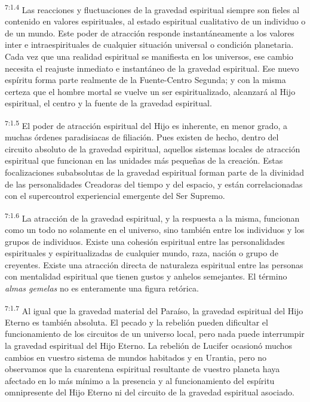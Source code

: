 \par
\textsuperscript{7:1.4} Las reacciones y fluctuaciones de la gravedad espiritual siempre son fieles al contenido en valores espirituales, al estado espiritual cualitativo de un individuo o de un mundo. Este poder de atracción responde instantáneamente a los valores inter e intraespirituales de cualquier situación universal o condición planetaria. Cada vez que una realidad espiritual se manifiesta en los universos, ese cambio necesita el reajuste inmediato e instantáneo de la gravedad espiritual. Ese nuevo espíritu forma parte realmente de la Fuente-Centro Segunda; y con la misma certeza que el hombre mortal se vuelve un ser espiritualizado, alcanzará al Hijo espiritual, el centro y la fuente de la gravedad espiritual.

\par
\textsuperscript{7:1.5} El poder de atracción espiritual del Hijo es inherente, en menor grado, a muchas órdenes paradisiacas de filiación. Pues existen de hecho, dentro del circuito absoluto de la gravedad espiritual, aquellos sistemas locales de atracción espiritual que funcionan en las unidades más pequeñas de la creación. Estas focalizaciones subabsolutas de la gravedad espiritual forman parte de la divinidad de las personalidades Creadoras del tiempo y del espacio, y están correlacionadas con el supercontrol experiencial emergente del Ser Supremo.

\par
\textsuperscript{7:1.6} La atracción de la gravedad espiritual, y la respuesta a la misma, funcionan como un todo no solamente en el universo, sino también entre los individuos y los grupos de individuos. Existe una cohesión espiritual entre las personalidades espirituales y espiritualizadas de cualquier mundo, raza, nación o grupo de creyentes. Existe una atracción directa de naturaleza espiritual entre las personas con mentalidad espiritual que tienen gustos y anhelos semejantes. El término \textit{almas gemelas} no es enteramente una figura retórica.

\par
\textsuperscript{7:1.7} Al igual que la gravedad material del Paraíso, la gravedad espiritual del Hijo Eterno es también absoluta. El pecado y la rebelión pueden dificultar el funcionamiento de los circuitos de un universo local, pero nada puede interrumpir la gravedad espiritual del Hijo Eterno. La rebelión de Lucifer ocasionó muchos cambios en vuestro sistema de mundos habitados y en Urantia, pero no observamos que la cuarentena espiritual resultante de vuestro planeta haya afectado en lo más mínimo a la presencia y al funcionamiento del espíritu omnipresente del Hijo Eterno ni del circuito de la gravedad espiritual asociado.

